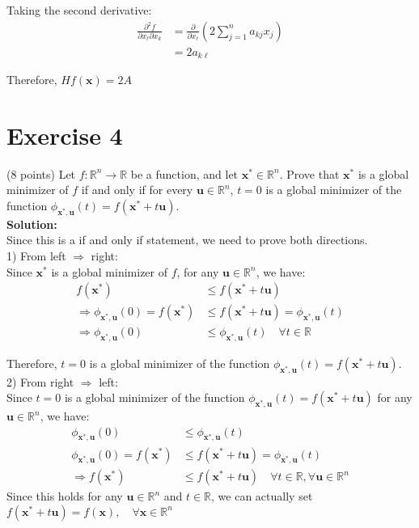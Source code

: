 \documentclass{article}
\begin{document}
Taking the second derivative:
\begin{align*}
\frac{\partial^2 f}{\partial x_\ell \partial x_k} &= \frac{\partial}{\partial x_\ell}(2\sum_{j=1}^n a_{kj}x_j) \\
&= 2a_{k\ell}
\end{align*}

Therefore, $Hf(\mathbf{x}) = 2A$

\newpage

\section*{Exercise 4}
(8 points) Let $f: \mathbb{R}^n \to \mathbb{R}$ be a function, and let $\mathbf{x}^* \in \mathbb{R}^n$. Prove that $\mathbf{x}^*$ is a global minimizer of $f$ if and only if for every $\mathbf{u} \in \mathbb{R}^n$, $t = 0$ is a global minimizer of the function $\phi_{\mathbf{x}^*,\mathbf{u}}(t) = f(\mathbf{x}^* + t\mathbf{u})$. \\

\textbf{Solution:} \\

Since this is a if and only if statement, we need to prove both directions. \\

1) From left $\Rightarrow$ right: \\

Since $\mathbf{x}^*$ is a global minimizer of $f$, for any $\mathbf{u} \in \mathbb{R}^n$, we have:
\begin{align*}
    f(\mathbf{x}^*) &\leq f(\mathbf{x}^* + t\mathbf{u}) \\
    \Rightarrow \phi_{\mathbf{x}^*,\mathbf{u}}(0) = f(\mathbf{x}^*) &\leq f(\mathbf{x}^* + t\mathbf{u}) = \phi_{\mathbf{x}^*,\mathbf{u}}(t) \\
    \Rightarrow \phi_{\mathbf{x}^*,\mathbf{u}}(0) &\leq \phi_{\mathbf{x}^*,\mathbf{u}}(t) \quad \forall t \in \mathbb{R}
\end{align*}

Therefore, $t = 0$ is a global minimizer of the function $\phi_{\mathbf{x}^*,\mathbf{u}}(t) = f(\mathbf{x}^* + t\mathbf{u})$. \\

2) From right $\Rightarrow$ left: \\

Since $t = 0$ is a global minimizer of the function $\phi_{\mathbf{x}^*,\mathbf{u}}(t) = f(\mathbf{x}^* + t\mathbf{u})$ for any $\mathbf{u} \in \mathbb{R}^n$, we have:
\begin{align*}
    \phi_{\mathbf{x}^*,\mathbf{u}}(0) &\leq \phi_{\mathbf{x}^*,\mathbf{u}}(t) \\
    \phi_{\mathbf{x}^*,\mathbf{u}}(0) = f(\mathbf{x}^*) &\leq f(\mathbf{x}^* + t\mathbf{u}) = \phi_{\mathbf{x}^*,\mathbf{u}}(t) \\
    \Rightarrow f(\mathbf{x}^*) &\leq f(\mathbf{x}^* + t\mathbf{u}) \quad \forall t \in \mathbb{R}, \forall \mathbf{u} \in \mathbb{R}^n
\end{align*}
Since this holds for any $\mathbf{u} \in \mathbb{R}^n$ and $t \in \mathbb{R}$, we can actually set $f(\mathbf{x}^* + t\mathbf{u}) = f(\mathbf{x}), \quad \forall \mathbf{x} \in \mathbb{R}^n$
\end{document}
